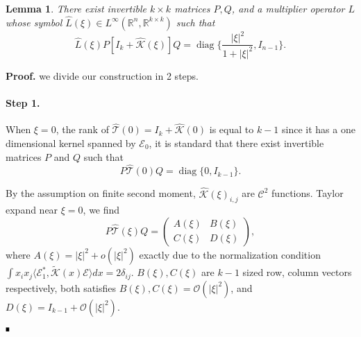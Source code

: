 \documentclass[letterpaper,11pt]{article}
\newcommand{\R}{\mathbb{R}}
\newcommand{\rmO}{\mathcal{O}}
\newcommand{\K}{\mathcal{K}}
\newcommand{\That}{\widehat{\mathcal{T}}}
\newcommand{\diag}{\operatorname{diag}}
\numberwithin{equation}{section}
\theoremstyle{plain}
\newtheorem{lemma}[theorem]{Lemma}
\theoremstyle{remark}
\newenvironment{Proof}[1][.]%
 {\begin{trivlist}\item[]\textbf{Proof#1 }}%
 {\hspace*{\fill}$\rule{0.3\baselineskip}{0.35\baselineskip}$\end{trivlist}}
\begin{document}
\begin{lemma}\label{Lem1} There exist invertible $k \times k$ matrices $P, Q$, and a multiplier operator $L$ whose symbol $\widehat{L}(\xi) \in L^\infty(\R^n, \R^{k\times k}) $ such that
\[
\widehat{L}(\xi)P[I_k+\widehat{\K}(\xi)]Q = \diag\{\dfrac{|\xi|^2}{1+|\xi|^2},I_{n-1} \}.
\]
\end{lemma}
\begin{Proof}
 we divide our construction in 2 steps.

\paragraph{Step 1.}
 When $\xi = 0$, the rank of $\widehat{\mathcal{T}}(0)=I_k+\widehat{\K}(0)$ is equal to $k-1$ since it has a one dimensional kernel spanned by $\mathcal{E}_0$, it is standard that there exist invertible matrices $P$ and $Q$ such that
\[
P\That(0)Q = \diag\{0,I_{k-1}\}.
\]



By the assumption on finite second moment, $\widehat{\K}(\xi)_{i,j}$ are $\mathscr{C}^2$ functions. Taylor expand near $\xi = 0$, we find
\[
P\That(\xi)Q = \begin{pmatrix}
A(\xi)& B(\xi)\\
C(\xi)& D(\xi) 
\end{pmatrix},
\]
where $A(\xi) = |\xi|^2+o(|\xi|^2)$ exactly due to the normalization condition $\int x_ix_j\langle \mathcal{E}_1^*, \tilde{\K}(x)\mathcal{E}\rangle dx = 2\delta_{ij}$. $B(\xi), C(\xi)$ are $k-1$ sized row, column vectors respectively, both satisfies $B(\xi),C(\xi) =\rmO(|\xi|^2)$, and $D(\xi) =I_{k-1}+\rmO(|\xi|^2)$. 



\end{Proof}
\end{document}

